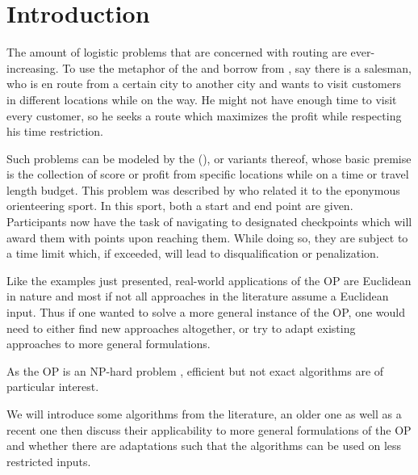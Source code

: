 \section{Introduction}
\label{sec:01:introduction}

The amount of logistic problems that are concerned with routing are ever-increasing.
To use the metaphor of the \tsplong and borrow from \citeauthor{chao_fast_1996} \cite{chao_fast_1996},
say there is a salesman, who is en route from a certain city to another city and wants to visit customers in different locations while on the way.
He might not have enough time to visit every customer, so he seeks a route which maximizes the profit while respecting his time restriction.

Such problems can be modeled by the \oplong (\op), or variants thereof,
whose basic premise is the collection of score or profit from specific locations while on a time or travel length budget.
This problem was described by \citeauthor{tsiligiridis_heuristic_1984} \cite{tsiligiridis_heuristic_1984} who related it to the eponymous orienteering sport.
In this sport, both a start and end point are given. Participants now have the task of navigating to designated checkpoints which will award them with points upon reaching them.
While doing so, they are subject to a time limit which, if exceeded, will lead to disqualification or penalization.

Like the examples just presented, real-world applications of the OP are Euclidean in nature and
most if not all approaches in the literature assume a Euclidean input. \cite{vansteenwegen_orienteering_2011}
Thus if one wanted to solve a more general instance of the OP, one would need to either find new approaches altogether,
or try to adapt existing approaches to more general formulations.

As the OP is an NP-hard problem \cite{golden_orienteering_1987}, efficient but not exact algorithms are of particular interest.

We will introduce some algorithms from the literature, an older one as well as a recent one
then discuss their applicability to more general formulations of the OP
and whether there are adaptations such that the algorithms can be used on less restricted inputs.
